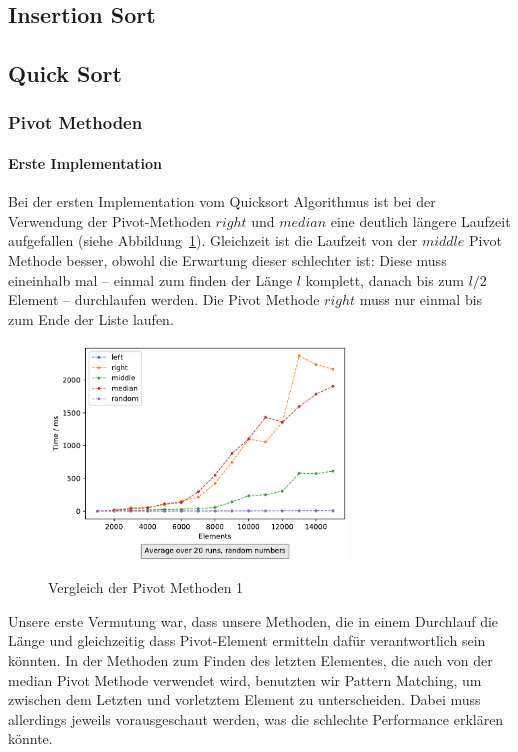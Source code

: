 \subsection{Insertion Sort}\label{subsec:insertion-sort-laufzeit}

\subsection{Quick Sort}\label{subsec:quick-sort-laufzeit}

\subsubsection{Pivot Methoden}

\paragraph{Erste Implementation}
Bei der ersten Implementation vom Quicksort Algorithmus ist bei der
Verwendung der Pivot-Methoden \(right\) und \(median\)  eine deutlich längere
Laufzeit aufgefallen (siehe Abbildung~\ref{fig:qsort-first-impl}).
Gleichzeit ist die Laufzeit von der \(middle\) Pivot Methode besser, obwohl
die Erwartung dieser schlechter ist:
Diese muss eineinhalb mal -- einmal zum finden der Länge \(l\) komplett, danach
bis zum \(l/2\) Element -- durchlaufen werden.
Die Pivot Methode \(right\) muss nur einmal bis zum Ende der Liste laufen.

\begin{figure}[hbt]
    \caption{Vergleich der Pivot Methoden 1}
    \centering
    \includegraphics[width = 8cm]
    {../out/pivotMethods_Implementation1.pdf}\label{fig:qsort-first-impl}
\end{figure}

Unsere erste Vermutung war, dass unsere Methoden, die in einem
Durchlauf die Länge und gleichzeitig dass Pivot-Element ermitteln dafür
verantwortlich sein könnten.
In der Methoden zum Finden des letzten Elementes, die auch von der median
Pivot Methode verwendet wird, benutzten wir Pattern Matching, um zwischen dem
Letzten und vorletztem Element zu unterscheiden.
Dabei muss allerdings jeweils vorausgeschaut werden, was die schlechte
Performance erklären könnte.

